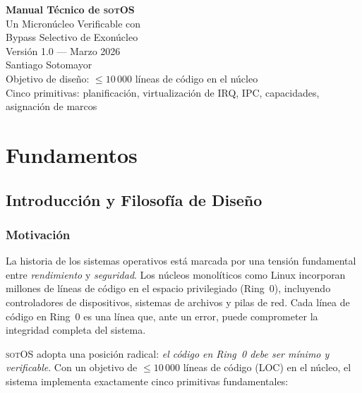 \documentclass[11pt,twoside,openright]{book}
\theoremstyle{definition}
\theoremstyle{plain}
\theoremstyle{remark}
\newcommand{\sotos}{\textsc{sotOS}}
\begin{document}
\begin{titlepage}
\centering
\vspace*{3cm}
{\Huge\bfseries Manual Técnico de \sotos\\[0.3cm]}
{\Large Un Micronúcleo Verificable con\\Bypass Selectivo de Exonúcleo}\\[2cm]
{\large Versión 1.0 — Marzo 2026}\\[3cm]
{\Large Santiago Sotomayor}\\[1cm]
\vfill
{\small
Objetivo de diseño: $\leq 10\,000$ líneas de código en el núcleo\\
Cinco primitivas: planificación, virtualización de IRQ, IPC, capacidades, asignación de marcos
}
\end{titlepage}

\frontmatter
\tableofcontents

\mainmatter
\part{Fundamentos}

\chapter{Introducción y Filosofía de Diseño}
\label{chap:intro}

\section{Motivación}

La historia de los sistemas operativos está marcada por una tensión fundamental entre
\emph{rendimiento} y \emph{seguridad}. Los núcleos monolíticos como Linux incorporan
millones de líneas de código en el espacio privilegiado (Ring~0), incluyendo controladores
de dispositivos, sistemas de archivos y pilas de red. Cada línea de código en Ring~0
es una línea que, ante un error, puede comprometer la integridad completa del sistema.

\sotos{} adopta una posición radical: \emph{el código en Ring~0 debe ser mínimo y
verificable}. Con un objetivo de $\leq 10\,000$ líneas de código (LOC) en el núcleo,
el sistema implementa exactamente cinco primitivas fundamentales:
\end{document}
